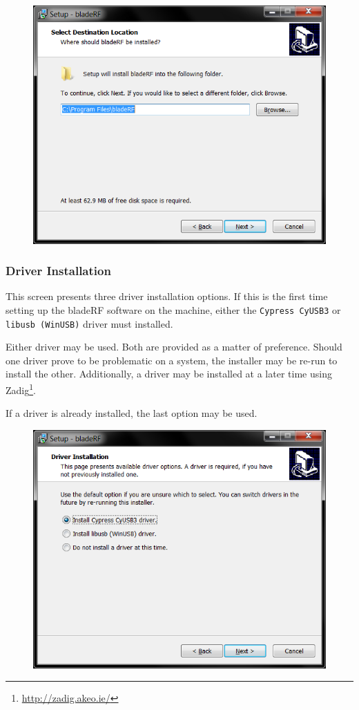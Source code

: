 {\begin{figure}[h]
  \centering
  \includegraphics{images/windows/installer/02-destination.png}
\end{figure}

\newpage
\subsubsection{Driver Installation}

This screen presents three driver installation options. If this is
the first time setting up the bladeRF software on the machine,
either the \texttt{Cypress CyUSB3} or \texttt{libusb (WinUSB)}
driver must installed.

Either driver may be used. Both are provided as a matter of preference.
Should one driver prove to be problematic on a system, the installer
may be re-run to install the other. Additionally, a driver may be
installed at a later time using Zadig\footnote{\url{http://zadig.akeo.ie/}}.

If a driver is already installed, the last option may be used.

\begin{figure}[h]
  \centering
  \includegraphics{images/windows/installer/03-driver.png}
\end{figure}

}
